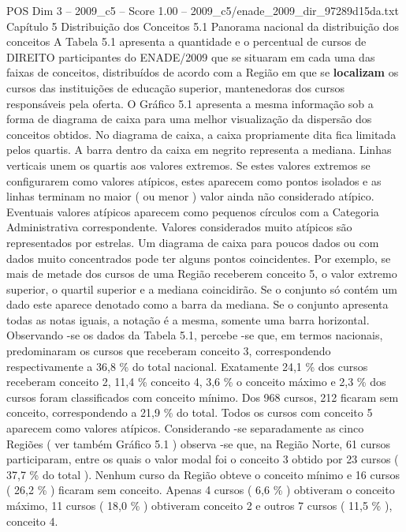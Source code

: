 \begin{textsample}{POS Dim 3 – 2009\_c5 – Score 1.00 – 2009\_c5/enade\_2009\_dir\_97289d15da.txt}  \label{ex:f3_pos_138}
Capítulo 5 Distribuição dos Conceitos 5.1 Panorama nacional da distribuição dos conceitos A Tabela 5.1 apresenta a quantidade e o percentual de cursos de DIREITO participantes do ENADE/2009 que se situaram em cada uma das faixas de conceitos, distribuídos de acordo com a Região em que se \textbf{localizam} os cursos das instituições de educação superior, mantenedoras dos cursos responsáveis pela oferta.
O Gráfico 5.1 apresenta a mesma informação sob a forma de diagrama de caixa para uma melhor visualização da dispersão dos conceitos obtidos.
No diagrama de caixa, a caixa propriamente dita fica limitada pelos quartis.
A barra dentro da caixa em negrito representa a mediana.
Linhas verticais unem os quartis aos valores extremos.
Se estes valores extremos se configurarem como valores atípicos, estes aparecem como pontos isolados e as linhas terminam no maior ( ou menor ) valor ainda não considerado atípico.
Eventuais valores atípicos aparecem como pequenos círculos com a Categoria Administrativa correspondente.
Valores considerados muito atípicos são representados por estrelas.
Um diagrama de caixa para poucos dados ou com dados muito concentrados pode ter alguns pontos coincidentes.
Por exemplo, se mais de metade dos cursos de uma Região receberem conceito 5, o valor extremo superior, o quartil superior e a mediana coincidirão.
Se o conjunto só contém um dado este aparece denotado como a barra da mediana.
Se o conjunto apresenta todas as notas iguais, a notação é a mesma, somente uma barra horizontal.
Observando -se os dados da Tabela 5.1, percebe -se que, em termos nacionais, predominaram os cursos que receberam conceito 3, correspondendo respectivamente a 36,8 \% do total nacional.
Exatamente 24,1 \% dos cursos receberam conceito 2, 11,4 \% conceito 4, 3,6 \% o conceito máximo e 2,3 \% dos cursos foram classificados com conceito mínimo.
Dos 968 cursos, 212 ficaram sem conceito, correspondendo a 21,9 \% do total.
Todos os cursos com conceito 5 aparecem como valores atípicos.
Considerando -se separadamente as cinco Regiões ( ver também Gráfico 5.1 ) observa -se que, na Região Norte, 61 cursos participaram, entre os quais o valor modal foi o conceito 3 obtido por 23 cursos ( 37,7 \% do total ).
Nenhum curso da Região obteve o conceito mínimo e 16 cursos ( 26,2 \% ) ficaram sem conceito.
Apenas 4 cursos ( 6,6 \% ) obtiveram o conceito máximo, 11 cursos ( 18,0 \% ) obtiveram conceito 2 e outros 7 cursos ( 11,5 \% ), conceito 4.

\end{textsample}
